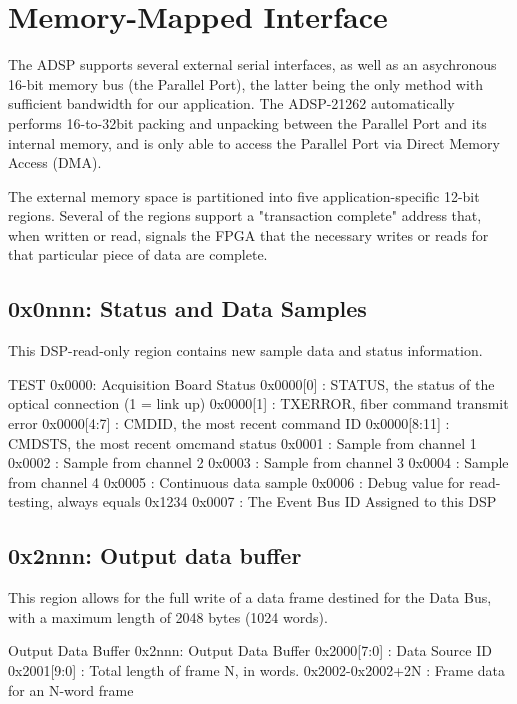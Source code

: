 
\section{Memory-Mapped Interface}

 The ADSP supports several external serial interfaces, as well
as an asychronous 16-bit memory bus (the Parallel Port), the latter
being the only method with sufficient bandwidth for our application.
The ADSP-21262 automatically performs 16-to-32bit packing and
unpacking between the Parallel Port and its internal memory, and is
only able to access the Parallel Port via Direct Memory Access (DMA).


 The external memory space is partitioned into five
application-specific 12-bit regions. Several of the regions support a
"transaction complete" address that, when written or read, signals the
FPGA that the necessary writes or reads for that particular piece of
data are complete.  

\subsection{0x0nnn: Status and  Data  Samples}
This DSP-read-only region contains new sample data and status
information.
\begin{memmap}{TEST}
0x0000: Acquisition Board Status
0x0000[0] : STATUS, the status of the optical connection (1 = link up)
0x0000[1] : TXERROR, fiber command transmit error
0x0000[4:7] : CMDID, the most recent command ID
0x0000[8:11] : CMDSTS, the most recent omcmand status
0x0001 : Sample from channel 1
0x0002 : Sample from channel 2
0x0003 : Sample from channel 3
0x0004 : Sample from channel 4
0x0005 :  Continuous data sample
0x0006 : Debug value for read-testing, always equals 0x1234
0x0007 : The Event Bus ID Assigned to this DSP
\end{memmap}


\subsection{0x2nnn: Output data buffer} 
 This region allows for the full write of a data frame destined
for the Data Bus, with a maximum length of 2048 bytes (1024
words).

\begin{memmap}{Output Data Buffer}
0x2nnn: Output Data Buffer
0x2000[7:0] : Data Source ID
0x2001[9:0] : Total length of frame N, in words. 
0x2002-0x2002+2N : Frame data for an N-word frame
\end{memmap}


